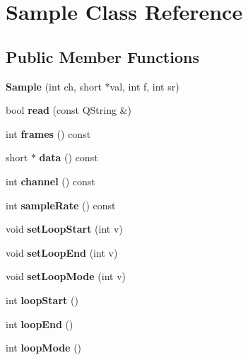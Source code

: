 \hypertarget{class_sample}{}\section{Sample Class Reference}
\label{class_sample}
\subsection*{Public Member Functions}
\begin{DoxyCompactItemize}
\item 
\mbox{\label{class_sample_aa8cacc4a4aa41ce5e55f609876c9aab5}} 
{\bfseries Sample} (int ch, short $\ast$val, int f, int sr)
\item 
\mbox{\label{class_sample_aa0bc065d1de3332f7319997c9c7c0ce2}} 
bool {\bfseries read} (const Q\+String \&)
\item 
\mbox{\label{class_sample_a4773ebe92ca9103457450e6d703bc01c}} 
int {\bfseries frames} () const
\item 
\mbox{\label{class_sample_a69f79d03b850670919e191ab07be9550}} 
short $\ast$ {\bfseries data} () const
\item 
\mbox{\label{class_sample_a94e10618fdc44ba55d3ed0bcf008919a}} 
int {\bfseries channel} () const
\item 
\mbox{\label{class_sample_aed21b3b6a7d72c0b87a01548435524c1}} 
int {\bfseries sample\+Rate} () const
\item 
\mbox{\label{class_sample_ab4248b2acd849c86baa83fcc699ec6b9}} 
void {\bfseries set\+Loop\+Start} (int v)
\item 
\mbox{\label{class_sample_ad9c91df64a37fe3a47039ed5dc33fe48}} 
void {\bfseries set\+Loop\+End} (int v)
\item 
\mbox{\label{class_sample_a2c9394d555d4699acacd7feefa28fd42}} 
void {\bfseries set\+Loop\+Mode} (int v)
\item 
\mbox{\label{class_sample_a36bf910e05c6225011046896d43133ff}} 
int {\bfseries loop\+Start} ()
\item 
\mbox{\label{class_sample_aa1dc3d9612e7374c0a3fbfaf279d7753}} 
int {\bfseries loop\+End} ()
\item 
\mbox{\label{class_sample_a4ccae026ac542670bf073d8fdf59877b}} 
int {\bfseries loop\+Mode} ()
\end{DoxyCompactItemize}


